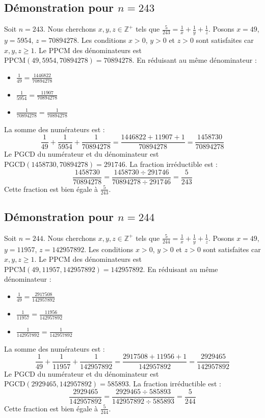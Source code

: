 \documentclass[11pt,a4paper]{article}
\begin{document}
\subsection{Démonstration pour $n = 243$}
Soit $n = 243$. Nous cherchons $x, y, z \in \mathbb{Z}^{+}$ tels que $\frac{5}{243} = \frac{1}{x} + \frac{1}{y} + \frac{1}{z}$.
Posons $x = 49$, $y = 5954$, $z = 70894278$.
Les conditions $x > 0$, $y > 0$ et $z > 0$ sont satisfaites car $x, y, z \geq 1$.
Le PPCM des dénominateurs est $\text{PPCM}(49, 5954, 70894278) = 70894278$.
En réduisant au même dénominateur :
\begin{itemize}
    \item $\frac{1}{49} = \frac{1446822}{70894278}$
    \item $\frac{1}{5954} = \frac{11907}{70894278}$
    \item $\frac{1}{70894278} = \frac{1}{70894278}$
\end{itemize}
La somme des numérateurs est :
$$ \frac{1}{49} + \frac{1}{5954} + \frac{1}{70894278} = \frac{1446822 + 11907 + 1}{70894278} = \frac{1458730}{70894278} $$
Le PGCD du numérateur et du dénominateur est $\text{PGCD}(1458730, 70894278) = 291746$.
La fraction irréductible est :
$$ \frac{1458730}{70894278} = \frac{1458730 \div 291746}{70894278 \div 291746} = \frac{5}{243} $$
Cette fraction est bien égale à $\frac{5}{243}$.

\subsection{Démonstration pour $n = 244$}
Soit $n = 244$. Nous cherchons $x, y, z \in \mathbb{Z}^{+}$ tels que $\frac{5}{244} = \frac{1}{x} + \frac{1}{y} + \frac{1}{z}$.
Posons $x = 49$, $y = 11957$, $z = 142957892$.
Les conditions $x > 0$, $y > 0$ et $z > 0$ sont satisfaites car $x, y, z \geq 1$.
Le PPCM des dénominateurs est $\text{PPCM}(49, 11957, 142957892) = 142957892$.
En réduisant au même dénominateur :
\begin{itemize}
    \item $\frac{1}{49} = \frac{2917508}{142957892}$
    \item $\frac{1}{11957} = \frac{11956}{142957892}$
    \item $\frac{1}{142957892} = \frac{1}{142957892}$
\end{itemize}
La somme des numérateurs est :
$$ \frac{1}{49} + \frac{1}{11957} + \frac{1}{142957892} = \frac{2917508 + 11956 + 1}{142957892} = \frac{2929465}{142957892} $$
Le PGCD du numérateur et du dénominateur est $\text{PGCD}(2929465, 142957892) = 585893$.
La fraction irréductible est :
$$ \frac{2929465}{142957892} = \frac{2929465 \div 585893}{142957892 \div 585893} = \frac{5}{244} $$
Cette fraction est bien égale à $\frac{5}{244}$.
\end{document}
